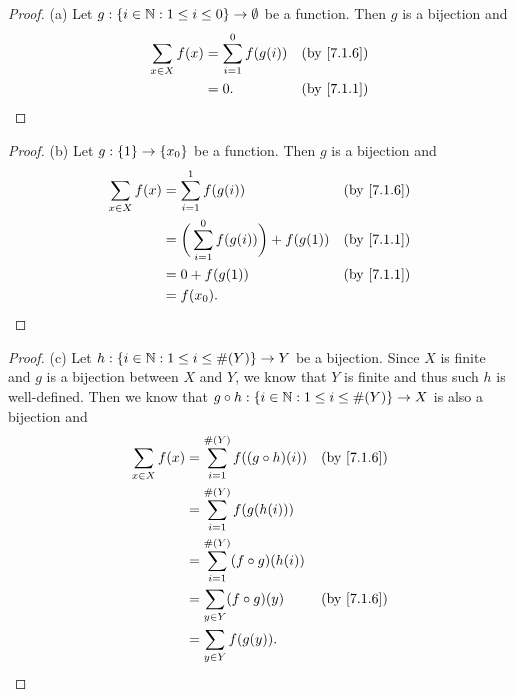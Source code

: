 \begin{proof}{(a)}
  Let \(g : \left\lbrace i \in \mathbb{N} : 1 \leq i \leq 0\right\rbrace \to \emptyset\) be a function.
  Then \(g\) is a bijection and
  \begin{align*}
    \sum_{x \in X} f(x) & = \sum_{i = 1}^0 f(g(i)) &  & \by{7.1.6} \\
                        & = 0.                     &  & \by{7.1.1}
  \end{align*}
\end{proof}

\begin{proof}{(b)}
  Let \(g : \left\lbrace1\right\rbrace \to \left\lbrace x_0\right\rbrace\) be a function.
  Then \(g\) is a bijection and
  \begin{align*}
    \sum_{x \in X} f(x) & = \sum_{i = 1}^1 f(g(i))                       &  & \by{7.1.6} \\
                        & = \bigg(\sum_{i = 1}^0 f(g(i))\bigg) + f(g(1)) &  & \by{7.1.1} \\
                        & = 0 + f(g(1))                                  &  & \by{7.1.1} \\
                        & = f(x_0).
  \end{align*}
\end{proof}

\begin{proof}{(c)}
  Let \(h : \left\lbrace i \in \mathbb{N} : 1 \leq i \leq \#(Y)\right\rbrace \to Y\) be a bijection.
  Since \(X\) is finite and \(g\) is a bijection between \(X\) and \(Y\), we know that \(Y\) is finite and thus such \(h\) is well-defined.
  Then we know that \(g \circ h : \left\lbrace i \in \mathbb{N} : 1 \leq i \leq \#(Y)\right\rbrace \to X\) is also a bijection and
  \begin{align*}
    \sum_{x \in X} f(x) & = \sum_{i = 1}^{\#(Y)} f((g \circ h)(i)) &  & \by{7.1.6} \\
                        & = \sum_{i = 1}^{\#(Y)} f(g(h(i)))                        \\
                        & = \sum_{i = 1}^{\#(Y)} (f \circ g)(h(i))                 \\
                        & = \sum_{y \in Y} (f \circ g)(y)          &  & \by{7.1.6} \\
                        & = \sum_{y \in Y} f(g(y)).
  \end{align*}
\end{proof}

